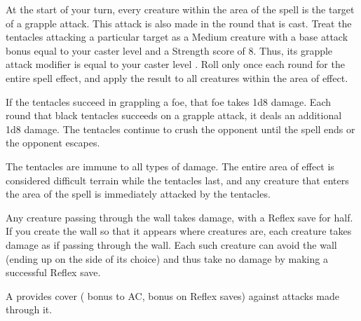 \spellrng{\rngmed}
\begin{spelleffect}
  At the start of your turn, every creature within the area of the spell is the target of a grapple attack. This attack is also made in the round that  is cast. Treat the tentacles attacking a particular target as a Medium creature with a base attack bonus equal to your caster level and a Strength score of 8. Thus, its grapple attack modifier is equal to your caster level . Roll only once each round for the entire spell effect, and apply the result to all creatures within the area of effect.
  \par If the tentacles succeed in grappling a foe, that foe takes 1d8 damage. Each round that black tentacles succeeds on a grapple attack, it deals an additional 1d8 damage. The tentacles continue to crush the opponent until the spell ends or the opponent escapes.
  \par The tentacles are immune to all types of damage. The entire area of effect is considered difficult terrain while the tentacles last, and any creature that enters the area of the spell is immediately attacked by the tentacles.
\end{spelleffect}

\spellrng{\rngmed}
\begin{spelleffect}
  Any creature passing through the wall takes damage, with a Reflex save for half. If you create the wall so that it appears where creatures are, each creature takes damage as if passing through the wall. Each such creature can avoid the wall (ending up on the side of its choice) and thus take no damage by making a successful Reflex save.
  \par A  provides cover ( bonus to AC,  bonus on Reflex saves) against attacks made through it.
\end{spelleffect}

